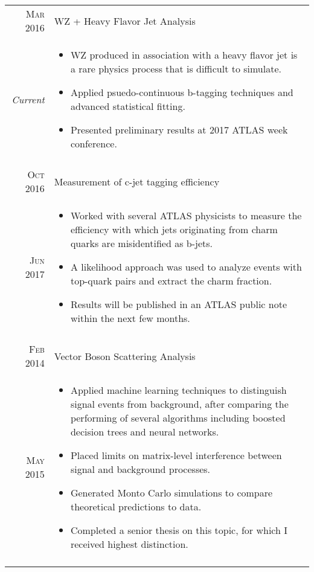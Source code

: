 \documentclass[a4paper,10pt]{article}
\begin{document}
\begin{longtable}{rp{11cm}}
    \textsc{Mar 2016}   &   WZ + Heavy Flavor Jet Analysis \\
    \emph{Current}      &   \footnotesize{ 
    \begin{itemize}[leftmargin=*,topsep=0pt]
        \item WZ produced in association with a heavy flavor jet is a rare physics process that is difficult to simulate. 
        \item Applied psuedo-continuous b-tagging techniques and advanced statistical fitting. 
        \item Presented preliminary results at 2017 ATLAS week conference.
    \end{itemize}
    }\\\\
          
    \textsc{Oct 2016} & Measurement of c-jet tagging efficiency \\
    \textsc{Jun 2017} & \footnotesize{
    \begin{itemize}[leftmargin=*,topsep=0pt,topsep=0pt]
        \item Worked with several ATLAS physicists to measure the efficiency with which jets originating from charm quarks are misidentified as b-jets. 
        \item A likelihood approach was used to analyze events with top-quark pairs and extract the charm fraction. 
        \item Results will be published in an ATLAS public note within the next few months.
    \end{itemize}
    }\\\\ 
    
    \textsc{Feb 2014}   & Vector Boson Scattering Analysis \\
    \textsc{May 2015}   & \footnotesize{
    \begin{itemize}[leftmargin=*,topsep=0pt]
        \item Applied machine learning techniques to distinguish signal events from background, after comparing the performing of several algorithms including boosted decision trees and neural networks.
        \item Placed limits on matrix-level interference between signal and background processes. 
        \item Generated Monto Carlo simulations to compare theoretical predictions to data. 
        \item Completed a senior thesis on this topic, for which I received highest distinction.
    \end{itemize}
    }\\\\
    

\end{longtable}
\end{document}
